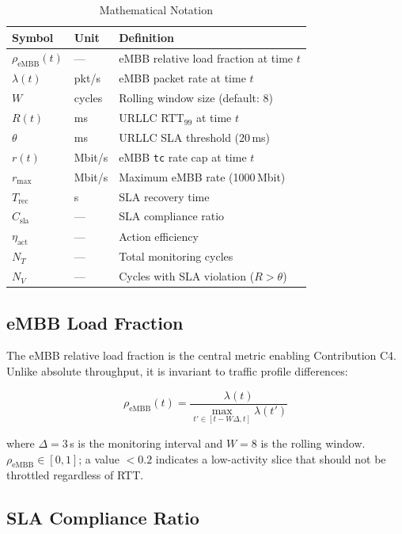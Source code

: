\begin{table}[H]
\centering
\caption{Mathematical Notation}
\label{tab:notation}
\begin{tabularx}{\textwidth}{llX}
\toprule
\textbf{Symbol} & \textbf{Unit} & \textbf{Definition} \\
\midrule
$\rho_{\text{eMBB}}(t)$ & — & eMBB relative load fraction at time $t$ \\
$\lambda(t)$  & pkt/s  & eMBB packet rate at time $t$ \\
$W$           & cycles & Rolling window size (default: 8) \\
$R(t)$        & ms     & URLLC RTT$_{99}$ at time $t$ \\
$\theta$      & ms     & URLLC SLA threshold (20\,ms) \\
$r(t)$        & Mbit/s & eMBB \texttt{tc} rate cap at time $t$ \\
$r_{\max}$    & Mbit/s & Maximum eMBB rate (1000\,Mbit) \\
$T_{\text{rec}}$ & s   & SLA recovery time \\
$C_{\text{sla}}$ & —   & SLA compliance ratio \\
$\eta_{\text{act}}$ & — & Action efficiency \\
$N_T$         & —      & Total monitoring cycles \\
$N_V$         & —      & Cycles with SLA violation ($R > \theta$) \\
\bottomrule
\end{tabularx}
\end{table}

\subsection{eMBB Load Fraction}

The eMBB relative load fraction is the central metric enabling Contribution C4. Unlike absolute throughput, it is invariant to traffic profile differences:

\begin{equation}
\rho_{\text{eMBB}}(t) = \frac{\lambda(t)}{\displaystyle\max_{t' \in [t-W\Delta, t]} \lambda(t')}
\label{eq:load_frac}
\end{equation}

where $\Delta = 3$\,s is the monitoring interval and $W = 8$ is the rolling window. $\rho_{\text{eMBB}} \in [0, 1]$; a value $< 0.2$ indicates a low-activity slice that should not be throttled regardless of RTT.

\subsection{SLA Compliance Ratio}

